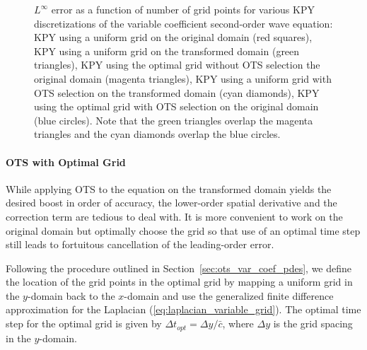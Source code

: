 \documentclass[twocolumn]{article} %
\def\cbar{\bar{c}}
\def\dt{\Delta t}
\def\dy{\Delta y}
\begin{document}
\begin{figure}[thb]
\begin{center}
\caption{$L^\infty$ error as a function of number of grid points for various
KPY discretizations of the variable coefficient second-order wave equation:
KPY using a uniform grid on the original domain (red squares),
KPY using a uniform grid on the transformed domain (green triangles),
KPY using the optimal grid without OTS selection the original domain 
(magenta triangles),
KPY using a uniform grid with OTS selection on the transformed domain 
(cyan diamonds),
KPY using the optimal grid with OTS selection on the original domain 
(blue circles).  Note that the green triangles overlap the magenta triangles 
and the cyan diamonds overlap the blue circles. 
}
\label{fig:var_coef_wave_eqn_1d_error}
\end{center}
\end{figure}

\paragraph*{OTS with Optimal Grid}
While applying OTS to the equation on the transformed domain yields the 
desired boost in order of accuracy, the lower-order spatial derivative and 
the correction term are tedious to deal with.  It is more convenient to 
work on the original domain but optimally choose the grid so that use of
an optimal time step still leads to fortuitous cancellation of the 
leading-order error.  

Following the procedure outlined in Section~\ref{sec:ots_var_coef_pdes}, we 
define the location of the grid points in the optimal grid by mapping
a uniform grid in the $y$-domain back to the $x$-domain and use 
the generalized finite difference approximation for the Laplacian 
(\ref{eq:laplacian_variable_grid}).  The optimal time step for the optimal
grid is given by $\dt_{opt} = \dy/\cbar$, where $\dy$ is the grid spacing 
in the $y$-domain.
\end{document}
